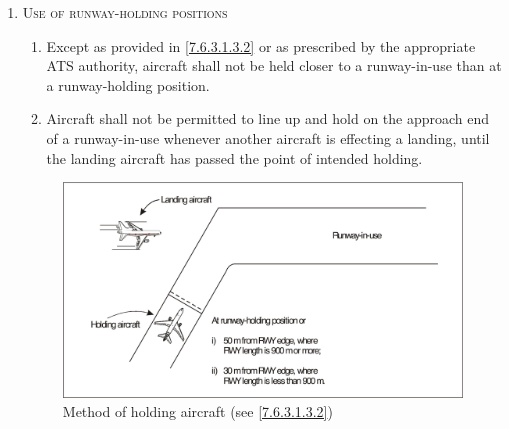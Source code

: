 \documentclass[../vATM.tex]{subfiles}
\begin{document}
\begin{enumeratesc}
\begin{enumerate}[labelindent=0pt,itemsep=0.2cm]
            \item \textsc{Use of runway-holding positions}
            \begin{enumerate}
                \item Except as provided in \ref{7.6.3.1.3.2} or as prescribed by the appropriate ATS authority, aircraft shall not be held closer to a runway-in-use than at a runway-holding position.
                \item \label{7.6.3.1.3.2} Aircraft shall not be permitted to line up and hold on the approach end of a runway-in-use whenever another aircraft is effecting a landing, until the landing aircraft has passed the point of intended holding.
            \end{enumerate}

            \vspace{0.5cm}
            \begin{figure}[!ht]
                \centering
                \includegraphics[width=14cm]{Images/Fig 7-2.png}
                \caption[Method of holding aircraft]{Method of holding aircraft (see \ref{7.6.3.1.3.2})}
                \label{fig:7-2}
            \end{figure}


\end{enumerate}
\end{enumeratesc}
\end{document}
